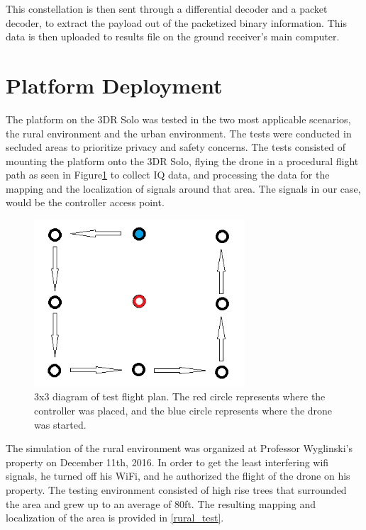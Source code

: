 This constellation is then sent through a differential decoder and a packet decoder, to extract the payload out of the packetized binary information. This data is then uploaded to results file on the ground receiver’s main computer.

\section{Platform Deployment}
The platform on the 3DR Solo was tested in the two most applicable scenarios, the rural environment and the urban environment. The tests were conducted in secluded areas to prioritize privacy and safety concerns. The tests consisted of mounting the platform onto the 3DR Solo, flying the drone in a procedural flight path as seen in Figure\ref{fig:test_setup} to collect IQ data, and processing the data for the mapping and the localization of signals around that area. The signals in our case, would be the controller access point. 

\begin{figure}[ht!]
	\centering
	\includegraphics[width=0.70\textwidth]{img/Test_Plan.png}
	\caption{3x3 diagram of test flight plan. The red circle represents where the controller was placed, and the blue circle represents where the drone was started.}
	\label{fig:test_setup}
\end{figure} \par

The simulation of the rural environment was organized at Professor Wyglinski's property on December 11th, 2016. In order to get the least interfering wifi signals, he turned off his WiFi, and he authorized the flight of the drone on his property. The testing environment consisted of high rise trees that surrounded the area and grew up to an average of 80ft. The resulting mapping and localization of the area is provided in \ref{rural_test}.

